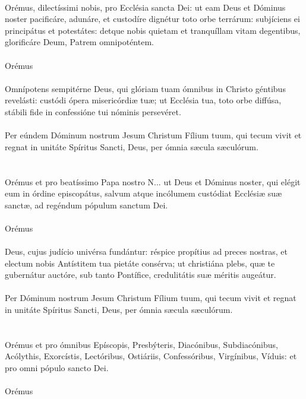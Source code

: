 \documentclass[12pt, a4paper]{article}
\begin{document}
	\\
	Orémus, dilectíssimi nobis, pro Ecclésia sancta Dei: ut eam Deus et Dóminus noster pacificáre, adunáre, et custodíre dignétur toto orbe terrárum: subjíciens ei principátus et potestátes: detque nobis quietam et tranquíllam vitam degentibus, glorificáre Deum, Patrem omnipoténtem.
	\\\\
	Orémus
	\\
	\\
	Omnípotens sempitérne Deus, qui glóriam tuam ómnibus in Christo géntibus revelásti: custódi ópera misericórdiæ tuæ; ut Ecclésia tua, toto orbe diffúsa, stábili fide in confessióne tui nóminis persevéret.
	\\\\
	Per eúndem Dóminum nostrum Jesum Christum Fílium tuum, qui tecum vivit et regnat in unitáte Spíritus Sancti, Deus, per ómnia sæcula sæculórum.
	\\\\
	\\
	Orémus et pro beatíssimo Papa nostro N... ut Deus et Dóminus noster, qui elégit eum in órdine episcopátus, salvum atque incólumem custódiat Ecclésiæ suæ sanctæ, ad regéndum pópulum sanctum Dei.
	\\\\
	Orémus
	\\
	\\
	Deus, cujus judício univérsa fundántur: réspice propítius ad preces nostras, et electum nobis Antístitem tua pietáte consérva; ut christiána plebs, quæ te gubernátur auctóre, sub tanto Pontífice, credulitátis suæ méritis augeátur.
	\\\\
	Per Dóminum nostrum Jesum Christum Fílium tuum, qui tecum vivit et regnat in unitáte Spíritus Sancti, Deus, per ómnia sæcula sæculórum.
	\\\\
	\\
	Orémus et pro ómnibus Epíscopis, Presbýteris, Diacónibus, Subdiacónibus, Acólythis, Exorcístis, Lectóribus, Ostiáriis, Confessóribus, Virgínibus, Víduis: et pro omni pópulo sancto Dei.
	\\\\
	Orémus
\end{document}
